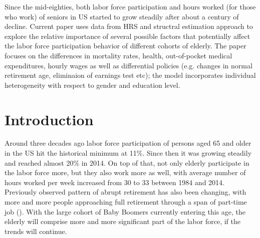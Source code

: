 \documentclass[
10pt, %
a4paper, %
oneside, %
headinclude,footinclude, %
BCOR5mm, %
]{scrartcl}
\begin{document}
Since the mid-eighties, both labor force participation and hours worked (for those who work) of seniors in US started to grow steadily after about a century of decline. Current paper uses data from HRS and structral estimation approach to explore the relative importance of several possible factors that potentially affect the labor force participation behavior of different cohorts of elderly. The paper focuses on the differences in mortality rates, health, out-of-pocket medical expenditures, hourly wages as well as differential policies (e.g. changes in normal retirement age, eliminaion of earnings test etc); the model incorporates individual heterogeneity with respect to gender and education level.

{\let\thefootnote\relax{}}



\newpage %


\section{Introduction}
Around three decades ago labor force participation of persons aged 65 and older in the US hit the historical minimum at 11\%. Since then it was growing steadily and reached almost 20\% in 2014. On top of that, not only elderly participate in the labor force more, but they also work more as well, with average number of hours worked per week increased from 30 to 33 between 1984 and 2014. Previously observed pattern of abrupt retirement has also been changing, with more and more people approaching full retirement through a span of part-time job (\cite{Rupert2015}). With the large cohort of Baby Boomers currently entering this age, the elderly will comprise more and more significant part of the labor force, if the trends will continue. 
\end{document}

